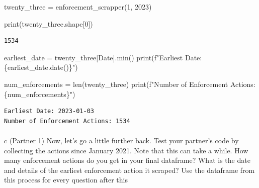 \documentclass[
  letterpaper,
  DIV=11,
  numbers=noendperiod]{scrartcl}
\makeatletter
\let\oldparagraph\paragraph
\renewcommand{\paragraph}{
    \@ifstar
      \xxxParagraphStar
      \xxxParagraphNoStar
  }
\newcommand{\xxxParagraphStar}[1]{\oldparagraph*{#1}\mbox{}}
\newcommand{\xxxParagraphNoStar}[1]{\oldparagraph{#1}\mbox{}}
\newenvironment{Shaded}{\begin{snugshade}}{\end{snugshade}}
\newcommand{\BuiltInTok}[1]{\textcolor[rgb]{0.00,0.23,0.31}{#1}}
\newcommand{\DecValTok}[1]{\textcolor[rgb]{0.68,0.00,0.00}{#1}}
\newcommand{\NormalTok}[1]{\textcolor[rgb]{0.00,0.23,0.31}{#1}}
\newcommand{\OperatorTok}[1]{\textcolor[rgb]{0.37,0.37,0.37}{#1}}
\newcommand{\SpecialCharTok}[1]{\textcolor[rgb]{0.37,0.37,0.37}{#1}}
\newcommand{\SpecialStringTok}[1]{\textcolor[rgb]{0.13,0.47,0.30}{#1}}
\newcommand{\StringTok}[1]{\textcolor[rgb]{0.13,0.47,0.30}{#1}}
\makeatother
\begin{document}
\begin{Shaded}
\begin{Highlighting}[]
\NormalTok{twenty\_three }\OperatorTok{=}\NormalTok{ enforcement\_scrapper(}\DecValTok{1}\NormalTok{, }\DecValTok{2023}\NormalTok{)  }

\BuiltInTok{print}\NormalTok{(twenty\_three.shape[}\DecValTok{0}\NormalTok{])}
\end{Highlighting}
\end{Shaded}

\begin{verbatim}
1534
\end{verbatim}

\begin{Shaded}
\begin{Highlighting}[]
\NormalTok{earliest\_date }\OperatorTok{=}\NormalTok{ twenty\_three[}\StringTok{\textquotesingle{}Date\textquotesingle{}}\NormalTok{].}\BuiltInTok{min}\NormalTok{()}
\BuiltInTok{print}\NormalTok{(}\SpecialStringTok{f"Earliest Date: }\SpecialCharTok{\{}\NormalTok{earliest\_date}\SpecialCharTok{.}\NormalTok{date()}\SpecialCharTok{\}}\SpecialStringTok{"}\NormalTok{)}

\NormalTok{num\_enforcements }\OperatorTok{=} \BuiltInTok{len}\NormalTok{(twenty\_three)}
\BuiltInTok{print}\NormalTok{(}\SpecialStringTok{f"Number of Enforcement Actions: }\SpecialCharTok{\{}\NormalTok{num\_enforcements}\SpecialCharTok{\}}\SpecialStringTok{"}\NormalTok{)}
\end{Highlighting}
\end{Shaded}

\begin{verbatim}
Earliest Date: 2023-01-03
Number of Enforcement Actions: 1534
\end{verbatim}

\paragraph{c (Partner 1) Now, let's go a little further back. Test your
partner's code by collecting the actions since January 2021. Note that
this can take a while. How many enforcement actions do you get in your
final dataframe? What is the date and details of the earliest
enforcement action it scraped? Use the dataframe from this process for
every question after
this}\label{c-partner-1-now-lets-go-a-little-further-back.-test-your-partners-code-by-collecting-the-actions-since-january-2021.-note-that-this-can-take-a-while.-how-many-enforcement-actions-do-you-get-in-your-final-dataframe-what-is-the-date-and-details-of-the-earliest-enforcement-action-it-scraped-use-the-dataframe-from-this-process-for-every-question-after-this}
\end{document}
